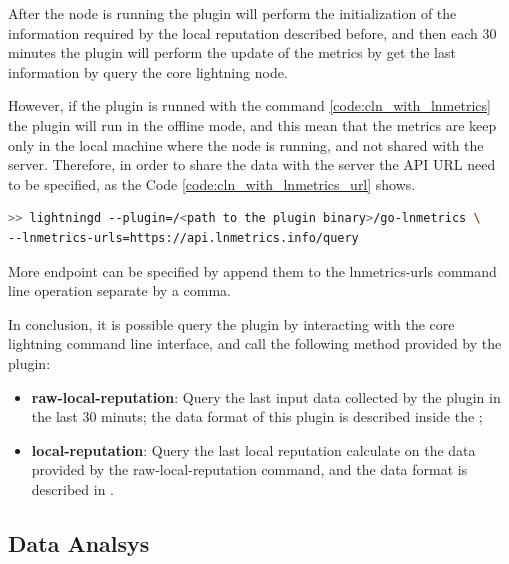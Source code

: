After the node is running the plugin will perform the initialization 
of the information required by the local reputation described before, and 
then each 30 minutes the plugin will perform the update of the metrics by 
get the last information by query the core lightning node. 

However, if the plugin is runned with the command \ref{code:cln_with_lnmetrics}
the plugin will run in the offline mode, and this mean that the metrics are keep 
only in the local machine where the node is running, and not shared with the server. 
Therefore, in order to share the data with the server the API URL need to be specified,
as the Code \ref{code:cln_with_lnmetrics_url} shows.

\begin{lstlisting}[language=bash, basicstyle=\small,
                  caption={Command to run core lightning with the lnmetrics plugin an publish the data.}, 
                  label={code:cln_with_lnmetrics_url}]
>> lightningd --plugin=/<path to the plugin binary>/go-lnmetrics \ 
--lnmetrics-urls=https://api.lnmetrics.info/query
\end{lstlisting}

More endpoint can be specified by append them to the lnmetrics-urls command line operation separate by a comma.

In conclusion, it is possible query the plugin by interacting with the core lightning command line interface,
and call the following method provided by the plugin:

\begin{itemize}
    \item {\bf raw-local-reputation}: Query the last input data collected by the plugin in the last 30 minuts; 
        the data format of this plugin is described inside the \cite{lnmetrics_localreputation};
    \item {\bf local-reputation}: Query the last local reputation calculate on the data provided by the 
        raw-local-reputation command, and the data format is described in \cite{lnmetrics_localreputation}.
\end{itemize}

\subsection{Data Analsys}

